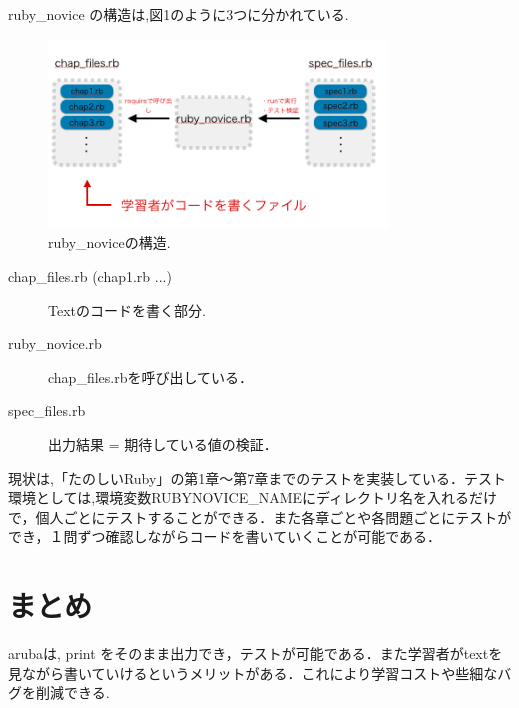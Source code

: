 \documentclass[10pt,a4j,twocolumn]{jsarticle}
\begin{document}

ruby\_novice の構造は,図1のように3つに分かれている.
\begin{figure}[H]
\begin{center}
     \includegraphics[width=9cm, bb=0 0 644 342]{abst.jpg}
     \caption{ruby\_noviceの構造.}
\end{center}
\end{figure}

\begin{description}
\item[chap\_files.rb (chap1.rb ...)]Textのコードを書く部分.
\item[ruby\_novice.rb] chap\_files.rbを呼び出している．
\item[spec\_files.rb]出力結果 = 期待している値の検証．
\end{description}

現状は,「たのしいRuby」\cite{HappyRuby}の第1章〜第7章までのテストを実装している．テスト環境としては,環境変数RUBYNOVICE\_NAMEにディレクトリ名を入れるだけで，個人ごとにテストすることができる．また各章ごとや各問題ごとにテストができ，１問ずつ確認しながらコードを書いていくことが可能である．

\section{まとめ}
arubaは, print をそのまま出力でき，テストが可能である．また学習者がtextを見ながら書いていけるというメリットがある．これにより学習コストや些細なバグを削減できる.
\end{document}
